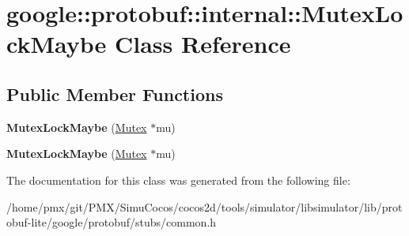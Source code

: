 \hypertarget{classgoogle_1_1protobuf_1_1internal_1_1MutexLockMaybe}{}\section{google\+:\+:protobuf\+:\+:internal\+:\+:Mutex\+Lock\+Maybe Class Reference}
\label{classgoogle_1_1protobuf_1_1internal_1_1MutexLockMaybe}
\subsection*{Public Member Functions}
\begin{DoxyCompactItemize}
\item 
\mbox{\label{classgoogle_1_1protobuf_1_1internal_1_1MutexLockMaybe_ad83ca6ff9b6cae1b1cc63b301ded1711}} 
{\bfseries Mutex\+Lock\+Maybe} (\hyperlink{classgoogle_1_1protobuf_1_1internal_1_1Mutex}{Mutex} $\ast$mu)
\item 
\mbox{\label{classgoogle_1_1protobuf_1_1internal_1_1MutexLockMaybe_ad83ca6ff9b6cae1b1cc63b301ded1711}} 
{\bfseries Mutex\+Lock\+Maybe} (\hyperlink{classgoogle_1_1protobuf_1_1internal_1_1Mutex}{Mutex} $\ast$mu)
\end{DoxyCompactItemize}


The documentation for this class was generated from the following file\+:\begin{DoxyCompactItemize}
\item 
/home/pmx/git/\+P\+M\+X/\+Simu\+Cocos/cocos2d/tools/simulator/libsimulator/lib/protobuf-\/lite/google/protobuf/stubs/common.\+h\end{DoxyCompactItemize}
